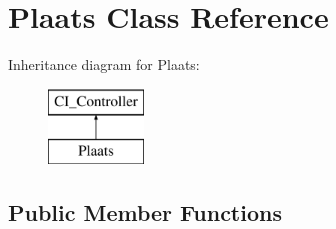 \hypertarget{class_plaats}{}\section{Plaats Class Reference}
\label{class_plaats}
Inheritance diagram for Plaats\+:\begin{figure}[H]
\begin{center}
\leavevmode
\includegraphics[height=2.000000cm]{class_plaats}
\end{center}
\end{figure}
\subsection*{Public Member Functions}
